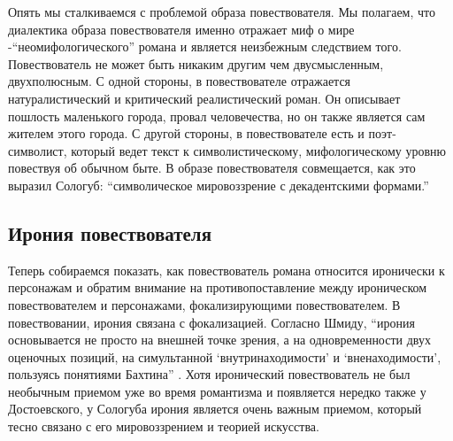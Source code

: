 \documentclass[12pt,a4paper]{article}
\begin{document}
Опять мы сталкиваемся с проблемой образа повествователя. Мы полагаем, что диалектика образа повествователя именно отражает миф о мире -\enquote{неомифологического} романа и является неизбежным следствием того. Повествователь не может быть никаким другим чем двусмысленным, двухполюсным. С одной стороны, в повествователе отражается натуралистический и критический реалистический роман. Он описывает пошлость маленького города, провал человечества, но он также является сам жителем этого города. С другой стороны, в повествователе есть и поэт-символист, который ведет текст к символистическому, мифологическому уровню повествуя об обычном быте. В образе повествователя совмещается, как это выразил Сологуб: \enquote{символическое мировоззрение с декадентскими формами.} %











\subsection{Ирония повествователя}


Теперь собираемся показать, как повествователь романа относится иронически к персонажам и обратим внимание на противопоставление
между ироническом повествователем и персонажами, фокализирующими повествователем. В повествовании, ирония связана с фокализацией. Согласно Шмиду, \enquote{ирония основывается не просто на внешней точке зрения, а на одновременности двух оценочных позиций, на симультанной \enquote{внутринаходимости} и \enquote{вненаходимости}, пользуясь понятиями Бахтина} \parencite[118]{schmid2008}.  Хотя иронический повествователь не был необычным приемом уже во время романтизма и появляется нередко также у Достоевского, у Сологуба ирония является очень важным приемом, который тесно связано с его мировоззрением и теорией искусства.
\end{document}
